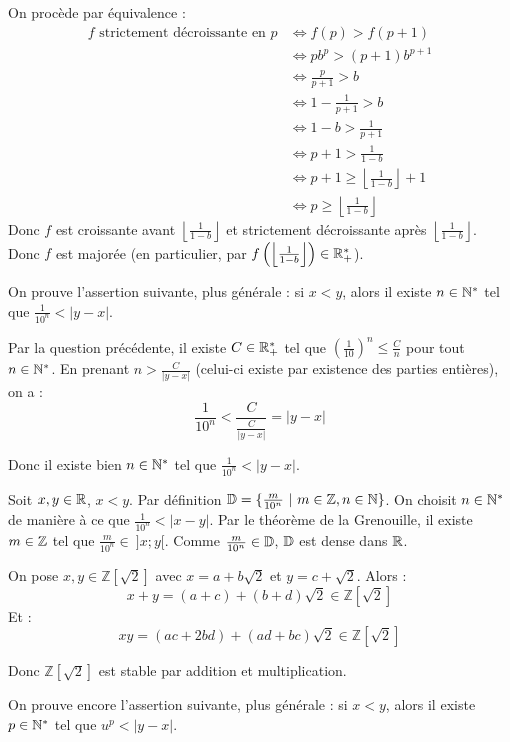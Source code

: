 \documentclass[]{../templates/homework}
\providecommand{\floor}[1]{\left \lfloor #1 \right \rfloor }
\begin{document}
On procède par équivalence :
\begin{align*}
	f \text{ strictement décroissante en } p & \iff f(p) > f(p+1) \\
		& \iff pb^p > (p+1)b^{p+1} \\
		& \iff \frac p {p+1} > b \\
		& \iff 1 - \frac 1 {p+1} > b \\
		& \iff 1 - b > \frac 1 {p+1} \\
		& \iff p +1 > \frac 1 {1-b} \\
		& \iff p + 1 \geq \floor {\frac 1 {1-b}} + 1 \\
		& \iff p \geq \floor {\frac 1 {1-b}}
\end{align*}
Donc $f$ est croissante avant $\floor {\frac 1 {1-b}}$ et strictement décroissante après $\floor {\frac 1 {1-b}}$. Donc $f$ est majorée (en particulier, par $f\left(\floor {\frac 1 {1-b}}\right ) \in \R_+^*$).

\subproblem
\question On prouve l'assertion suivante, plus générale : si $x < y$, alors il existe $n\in\mathbb N^*$ tel que $\frac 1 {10^n} < |y-x|$. 

Par la question précédente, il existe $C\in\mathbb R_+^*$ tel que $\left(\frac 1 {10}\right)^n \leq \frac C n$ pour tout $n\in\mathbb N^*$. En prenant $n > \frac C {|y-x|}$ (celui-ci existe par existence des parties entières), on a : $$\frac 1 {10^n} < \frac C {\frac C {|y-x|}} = |y-x|$$

Donc il existe bien $n \in \mathbb N^*$ tel que $\frac 1 {10^n} < |y-x|$.

\question Soit $x,y\in\mathbb R$, $x<y$. Par définition $\D = \{\frac m {10^n}\ |\ m\in\Z, n\in\N\}$. On choisit $n\in\mathbb N^*$ de manière à ce que $\frac 1 {10^n} < |x-y|$. Par le théorème de la Grenouille, il existe $m\in\mathbb Z$ tel que $\frac m {10^n} \in\ ]x;y[$. Comme $\frac m {10^n} \in \mathbb D$, $\mathbb D$ est dense dans $\mathbb R$.


\subproblem
\newcommand{\Ztwo}{\mathbb Z[\sqrt 2]}
\question On pose $x,y \in \Ztwo$ avec $x = a + b\sqrt2$ et $y = c+\sqrt 2$. Alors :
\begin{equation*}
	x+y = (a+c) + (b+d)\sqrt 2 \in \Ztwo
\end{equation*}
Et :
\begin{equation*}
	xy = (ac+2bd) + (ad + bc)\sqrt 2 \in \Ztwo
\end{equation*}

Donc $\Ztwo$ est stable par addition et multiplication.

\question On prouve encore l'assertion suivante, plus générale : si $x < y$, alors il existe $p\in\mathbb N^*$ tel que $u^p < |y-x|$. 
\end{document}
